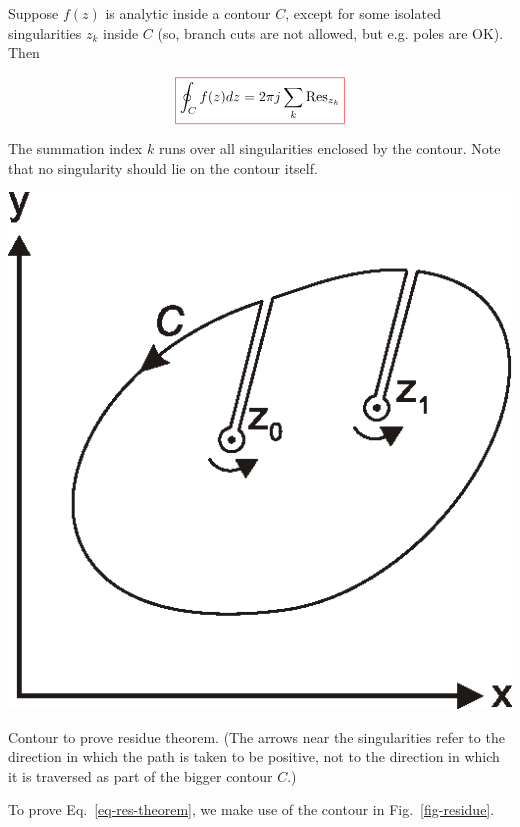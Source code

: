 \pagebreak


Suppose $f(z)$ is analytic inside a contour ${C}$, except for some isolated singularities $z_k$ inside ${C}$ (so, branch cuts are not allowed, but e.g. poles are OK). Then

\begin{equation}
\fbox{$\displaystyle
\oint_{{C}} f(z) dz = 2 \pi j \sum_k \mathrm{Res}_{z_k} \label{eq-res-theorem}
$}
\end{equation} 

The summation index $k$ runs over all singularities enclosed by the contour. Note that no singularity should lie on the contour itself.

\begin{marginfigure}
\centering
\includegraphics{complex/figures/residue}
\caption{Contour to prove residue theorem. (The arrows near the singularities refer to the direction in which the path is taken to be positive, not to the direction in which it is traversed as part of the bigger contour $C$.)}
\label{fig-residue}
\end{marginfigure}

To prove Eq.~\ref{eq-res-theorem}, we make use of the contour in Fig.~\ref{fig-residue}.

